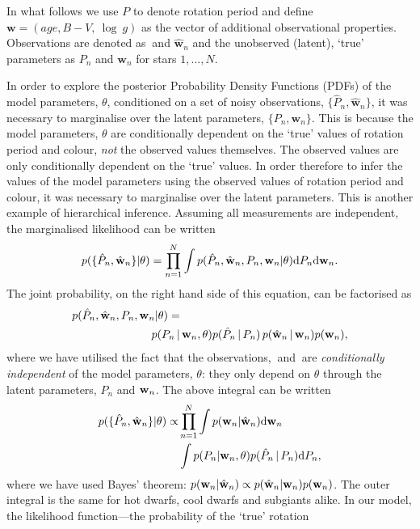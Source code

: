 In what follows we use $P$ to denote rotation period and define
$\mathbf{w} = (age, B-V,~\log~g)$ as the vector of additional observational
properties.
Observations are denoted as \ph$~$and $\hat{\mathbf{w}}_n$ and the unobserved
(latent), `true' parameters as $P_n$ and $\mathbf{w}_n$ for stars $1,...,N$.

In order to explore the posterior Probability Density Functions (PDFs) of
the model parameters, $\theta$, conditioned on a set of noisy observations,
$\{\hat{P}_n, \hat{\mathbf{w}}_n\}$, it was necessary to marginalise over the
latent parameters, $\{P_n, \mathbf{w}_n\}$.
This is because the model parameters, $\theta$ are conditionally dependent on
the `true' values of rotation period and colour, \emph{not} the observed
values themselves.
The observed values are only conditionally dependent on the `true' values.
In order therefore to infer the values of the model parameters using the
observed values of rotation period and colour, it was necessary to marginalise
over the latent parameters.  %
This is another example of hierarchical inference.
Assuming all measurements are independent, the marginalised likelihood can be
written
\begin{equation}
	p(\{\hat{P}_n,\hat{\mathbf{w}}_n\}|\theta) =
	\prod_{n=1}^{N} \int p(\hat{P}_n,\hat{\mathbf{w}}_n,P_n,\mathbf{w}_n|\theta)
	{\rm d}P_n {\rm d}\mathbf{w}_n.
\label{eq:fulll}
\end{equation}
The joint probability, on the right hand side of this equation, can be
factorised as
\begin{align}
	p(\hat{P}_n,\hat{\mathbf{w}}_n,P_n,\mathbf{w}_n|\theta) = & \\
	p(P_n\,| & \,\mathbf{w}_n,\theta)
	p(\hat{P}_n\,|\,P_n)\,p(\hat{\mathbf{w}}_n\,|\,\mathbf{w}_n)p(\mathbf{w}_n),
\nonumber
\end{align}
where we have utilised the fact that the observations, \ph$~$and \wh$~$are
{\it conditionally independent} of the model parameters, $\theta$: they only
depend on $\theta$ through the latent parameters, $P_n$ and $\mathbf{w}_n$.
The above integral can  be written
\begin{eqnarray} \label{eq:lhf_gyro}
	p(\{\hat{P}_n,\hat{\mathbf{w}}_n\}|\theta) \propto &
	\prod_{n=1}^{N} \int p(\mathbf{w}_n|\hat{\mathbf{w}}_n) {\rm d}\mathbf{w}_n \\ \nonumber
	& \int p(P_n|\mathbf{w}_n,\theta) p(\hat{P}_n\,|\,P_n) {\rm d}P_n,
\end{eqnarray}
where we have used Bayes' theorem:
$p(\mathbf{w}_n|\hat{\mathbf{w}}_n) \propto p(\hat{\mathbf{w}}_n|\mathbf{w}_n)p(\mathbf{w}_n)$.
The outer integral is the same for hot dwarfs, cool dwarfs and subgiants
alike.
In our model, the likelihood function---the probability of the `true' rotation
